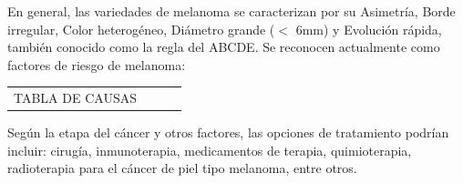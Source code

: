 En general, las variedades de melanoma se caracterizan por su Asimetría, Borde irregular, Color heterogéneo, Diámetro grande ($<$ 6mm) y Evolución rápida, también conocido como la regla del ABCDE.
Se reconocen actualmente como factores de riesgo de melanoma: 
\bigskip

\begin{tabular}{|cl|cl|}
TABLA DE CAUSAS
\end{tabular}

\bigskip
Según la etapa del cáncer y otros factores, las opciones de tratamiento podrían incluir: cirugía, inmunoterapia, medicamentos de terapia, quimioterapia, radioterapia para el cáncer de piel tipo melanoma, entre otros.
